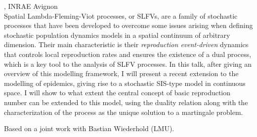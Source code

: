 \documentclass[12pt,a4paper]{article}
\begin{document}
\bigskip\bigskip

, INRAE Avignon \\[2ex] Spatial Lambda-Fleming-Viot processes, or SLFVs, are a family of stochastic processes that have been developed to overcome some issues arising when defining stochastic population dynamics models in a spatial continuum of arbitrary dimension. Their main characteristic is their {\em reproduction event-driven} dynamics that controls local reproduction rates and ensures the existence of a dual process, which is a key tool to the analysis of SLFV processes. In this talk, after giving an overview of this modelling framework, I will present a recent extension to the modelling of epidemics, giving rise to a stochastic SIS-type model in continuous space. I will show to what extent the central concept of basic reproduction number can be extended to this model, using the duality relation along with the characterization of the process as the unique solution to a martingale problem. 
 
 Based on a joint work with Bastian Wiederhold (LMU). 

\bigskip\bigskip
\end{document}
